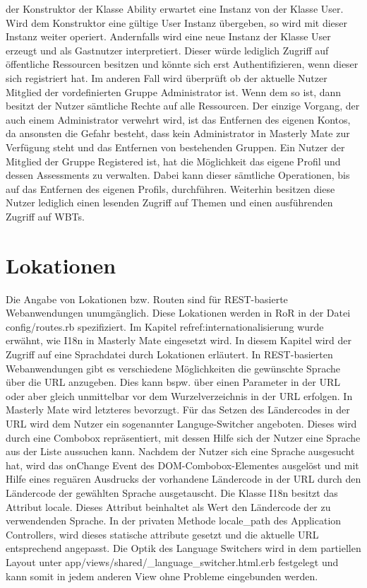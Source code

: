 der Konstruktor der Klasse Ability erwartet eine Instanz von der Klasse
User. Wird dem Konstruktor eine gültige User Instanz übergeben, so wird
mit dieser Instanz weiter operiert. Andernfalls wird eine neue Instanz der
Klasse User erzeugt und als Gastnutzer interpretiert. Dieser würde lediglich
Zugriff auf öffentliche Ressourcen besitzen und könnte sich erst
Authentifizieren, wenn dieser sich registriert hat. Im anderen Fall wird
überprüft ob der aktuelle Nutzer Mitglied der vordefinierten Gruppe
Administrator ist. Wenn dem so ist, dann besitzt der Nutzer sämtliche Rechte auf
alle Ressourcen. Der einzige Vorgang, der auch einem Administrator verwehrt
wird, ist das Entfernen des eigenen Kontos, da ansonsten die Gefahr
besteht, dass kein Administrator in Masterly Mate zur Verfügung steht und das
Entfernen von bestehenden Gruppen. Ein Nutzer der Mitglied der Gruppe Registered
ist, hat die Möglichkeit das eigene Profil und dessen Assessments zu verwalten.
Dabei kann dieser sämtliche Operationen, bis auf das Entfernen des eigenen Profils,
durchführen. Weiterhin besitzen diese Nutzer lediglich einen lesenden Zugriff
auf Themen und einen ausführenden Zugriff auf WBTs. 

\section{Lokationen}
Die Angabe von Lokationen bzw. Routen sind für REST-basierte Webanwendungen
unumgänglich. Diese Lokationen werden in RoR in der Datei 
config/routes.rb spezifiziert. Im Kapitel ref{ref:internationalisierung}
wurde erwähnt, wie I18n in Masterly Mate eingesetzt wird. In diesem Kapitel wird der
Zugriff auf eine Sprachdatei durch Lokationen erläutert. In REST-basierten
Webanwendungen gibt es verschiedene Möglichkeiten die gewünschte Sprache über
die URL anzugeben. Dies kann bspw. über einen Parameter in der URL oder
aber gleich unmittelbar vor dem Wurzelverzeichnis in der URL erfolgen. In
Masterly Mate wird letzteres bevorzugt. Für das Setzen des Ländercodes in der
URL wird dem Nutzer ein sogenannter Languge-Switcher angeboten. Dieses wird
durch eine Combobox repräsentiert, mit dessen Hilfe sich der Nutzer eine Sprache
aus der Liste aussuchen kann. Nachdem der Nutzer sich eine Sprache ausgesucht
hat, wird das onChange Event des DOM-Combobox-Elementes ausgelöst und mit Hilfe
eines reguären Ausdrucks der vorhandene Ländercode in der URL durch den
Ländercode der gewählten Sprache ausgetauscht. Die Klasse I18n besitzt das
Attribut locale. Dieses Attribut beinhaltet als Wert den Ländercode der zu
verwendenden Sprache. In der privaten Methode locale\_path des Application
Controllers, wird dieses statische attribute gesetzt und die aktuelle URL
entsprechend angepasst. Die Optik des Language Switchers wird in dem partiellen
Layout unter app/views/shared/\_language\_switcher.html.erb festgelegt und kann
somit in jedem anderen View ohne Probleme eingebunden werden.

